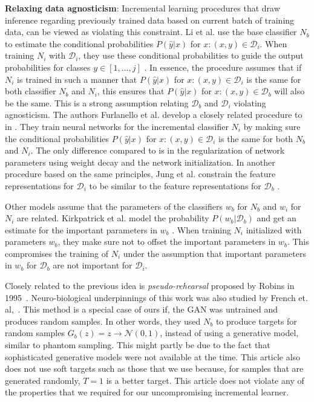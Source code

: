 \documentclass[10pt,twocolumn,letterpaper]{article}
\def \cD{{\mathcal{D}}}
\begin{document}
	\noindent\textbf{Relaxing data agnosticism}: 
	Incremental learning procedures that draw inference regarding previously trained data based on current batch of training data, can be viewed as violating this constraint. 
	Li et al. use the base classifier $N_b$ to estimate the conditional probabilities $P(\hat{y}|x)$ for $x:(x,y)\in\cD_i$. 
	When training $N_i$ with $\cD_i$, they use these conditional probabilities to guide the output probabilities for classes $y\in[1,\ldots, j]$ \cite{li2016learning}. 
	In essence, the procedure assumes that if $N_i$ is trained in such a manner that $P(\hat{y}|x)$ for $x:(x,y)\in\cD_i$ is the same for both classifier $N_b$ and $N_i$, this ensures that $P(\hat{y}|x)$ for $x:(x,y)\in\cD_b$ will also be the same. 
	This is a strong assumption relating $\cD_b$ and $\cD_i$ violating agnosticism. 
	The authors Furlanello et al. develop a closely related procedure to in \cite{furlanello2016active}. 
	They train neural networks for the incremental classifier $N_i$ by making sure the conditional probabilities $P(\hat{y}|x)$ for $x:(x,y)\in\cD_i$ is the same for both $N_b$ and $N_i$. 
	The only difference compared to \cite{li2016learning} is in the regularization of network parameters using weight decay and the network initialization. 
	In another procedure based on the same principles, Jung et al. constrain the feature representations for $\cD_i$ to be similar to the feature representations for $\cD_b$ \cite{jung2016less}. 
	
	Other models assume that the parameters of the classifiers $w_b$ for $N_b$ and $w_i$ for $N_i$ are related. 
	Kirkpatrick et al. model the probability $P(w_b|\cD_b)$ and get an estimate for the important parameters in $w_b$ \cite{kirkpatrick2016overcoming}. 
	When training $N_i$ initialized with parameters $w_b$, they make sure not to offset the important parameters in $w_b$. 
	This compromises the training of $N_i$ under the assumption that important parameters in $w_b$ for $\cD_b$ are not important for $\cD_i$.  
	
	Closely related to the previous idea is \emph{pseudo-rehearsal} proposed by Robins in 1995~\cite{robins1995catastrophic}. 
	Neuro-biological underpinnings of this work was also studied by French et. al,~\cite{french1997pseudo}. 
	This method is a special case of ours if, the GAN was untrained and produces random samples.
	In other words, they used $N_b$ to produce targets for random samples $G_b(z) = z \rightarrow \mathcal{N}(0,1)$, instead of using a generative model, similar to phantom sampling. 
	This might partly be due to the fact that sophisticated generative models were not available at the time. 
	This article also does not use soft targets such as those that we use because, for samples that are generated randomly, $T=1$ is a better target. This article does not violate any of the properties that we required for our uncompromising incremental learner.
	
\end{document}
